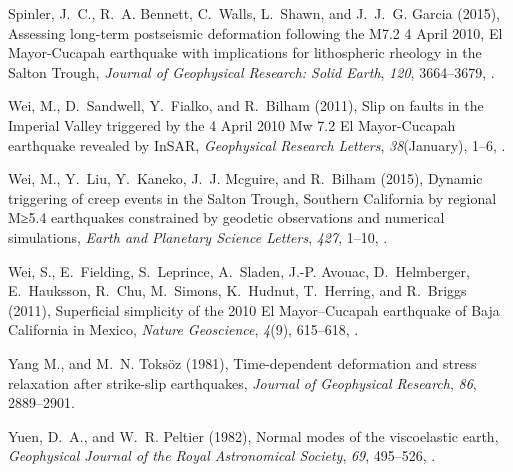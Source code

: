 \documentclass[draft,linenumbers]{AGUJournal}
\begin{document}
\begin{thebibliography}{52}
Spinler, J.~C., R.~A. Bennett, C.~Walls, L.~Shawn, and J.~J.~G. Garcia (2015),
  {Assessing long-term postseismic deformation following the M7.2 4 April 2010,
  El Mayor-Cucapah earthquake with implications for lithospheric rheology in
  the Salton Trough}, \textit{Journal of Geophysical Research: Solid Earth},
  \textit{120}, 3664--3679, .

Wei, M., D.~Sandwell, Y.~Fialko, and R.~Bilham (2011{}), {Slip on
  faults in the Imperial Valley triggered by the 4 April 2010 Mw 7.2 El
  Mayor-Cucapah earthquake revealed by InSAR}, \textit{Geophysical Research
  Letters}, \textit{38}(January), 1--6, .

Wei, M., Y.~Liu, Y.~Kaneko, J.~J. Mcguire, and R.~Bilham (2015), {Dynamic
  triggering of creep events in the Salton Trough, Southern California by
  regional M≥5.4 earthquakes constrained by geodetic observations and
  numerical simulations}, \textit{Earth and Planetary Science Letters},
  \textit{427}, 1--10, .

Wei, S., E.~Fielding, S.~Leprince, A.~Sladen, J.-P. Avouac, D.~Helmberger,
  E.~Hauksson, R.~Chu, M.~Simons, K.~Hudnut, T.~Herring, and R.~Briggs
  (2011{}), {Superficial simplicity of the 2010 El Mayor–Cucapah
  earthquake of Baja California in Mexico}, \textit{Nature Geoscience},
  \textit{4}(9), 615--618, .

Yang M., and M.~N. Toks\"oz (1981), {Time-dependent deformation and stress relaxation after strike-slip earthquakes}, \textit{Journal of Geophysical Research}, \textit{86}, 2889--2901.


Yuen, D.~A., and W.~R. Peltier (1982), {Normal modes of the viscoelastic
  earth}, \textit{Geophysical Journal of the Royal Astronomical Society},
  \textit{69}, 495--526, .

\end{thebibliography}
\end{document}
